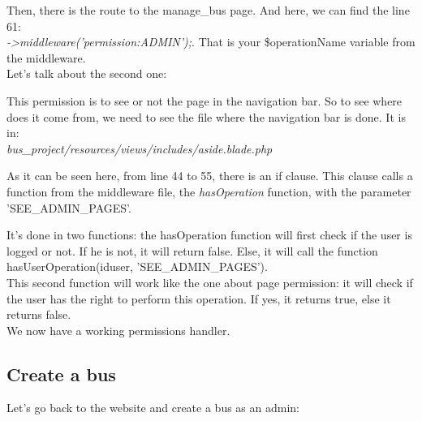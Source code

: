 \documentclass[12pt,a4paper,openany]{book}
\begin{document}
Then, there is the route to the manage\_bus page. And here, we can find the line 61:\\ \emph{->middleware('permission:ADMIN');}. That is your \$operationName variable from the middleware.\\

Let's talk about the second one:

This permission is to see or not the page in the navigation bar. So to see where does it come from, we need to see the file where the navigation bar is done. It is in:\\
\emph{bus\_project/resources/views/includes/aside.blade.php}

\bigskip
As it can be seen here, from line 44 to 55, there is an if clause. This clause calls a function from the middleware file, the \emph{hasOperation} function, with the parameter 'SEE\_ADMIN\_PAGES'.

\bigskip
It's done in two functions: the hasOperation function will first check if the user is logged or not. If he is not, it will return false. Else, it will call the function hasUserOperation(iduser, 'SEE\_ADMIN\_PAGES').\\

This second function will work like the one about page permission: it will check if the user has the right to perform this operation. If yes, it returns true, else it returns false.\\

We now have a working permissions handler.

\subsection{Create a bus}
Let's go back to the website and create a bus as an admin:\\
\end{document}
